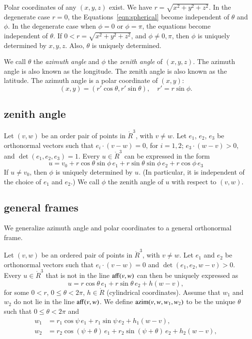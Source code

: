 Polar coordinates of any $(x,y,z)$ exist.
We have $r = \sqrt{x^2+y^2+z^2}$.  In the degenerate case $r=0$,
the Equations~\ref{eqn:spherical} become independent of $\theta$
and $\phi$. In the degenerate case when $\phi = 0$ or $\phi =
\pi$, the equations become independent of $\theta$. If $0<r =
\sqrt{x^2+y^2+z^2}$, and $\phi\ne 0,\pi$,  then $\phi$ is uniquely
determined by $x,y,z$. Also, $\theta$ is uniquely determined.


\begin{remark}\label{def:azimuth}
We call $\theta$ the {\it azimuth angle\/} and $\phi$ the {\it
zenith angle\/} of $(x,y,z)$.  The azimuth angle is also known as
the longitude.  The zenith angle is also known as the latitude. The
azimuth angle is a polar coordinate of $(x,y)$:
    $$
    (x,y) = (r'\cos\theta,r'\sin\theta), \quad r' = r\sin\phi.
    $$
\end{remark}

\subsection{zenith angle}

\begin{definition}
Let $(v,w)$ be an order pair of points in $\ring{R}^3$, with $v\ne w$.
Let $e_1$, $e_2$, $e_3$ be orthonormal vectors such that
$e_i\cdot (v-w)=0$, for $i=1,2$; $e_3\cdot (w-v)>0$,
and $\det(e_1,e_2,e_3)=1$.  Every
$u\in\ring{R}^3$ 
can be expressed in the form
   $$
   u = v_0 + r\cos\theta\sin\phi\,e_1 + r\sin\theta\sin\phi\,e_2 +
   r\cos\phi\, e_3
   $$
If $u\ne v_0$, then $\phi$ is uniquely determined by $u$.
(In particular, it is independent of the choice of $e_1$ and $e_2$.)
We call $\phi$ the zenith angle of $u$ with respect to $(v,w)$.
\end{definition}

\subsection{general frames}

We generalize azimuth angle and polar coordinates to a general orthonormal frame.

\begin{definition} Let $(v,w)$ be an ordered pair of points in
$\ring{R}^3$, with $v\ne w$.  Let $e_1$ and $e_2$ be orthonormal
vectors
such that $e_i\cdot (v-w)=0$ and $\det(e_1,e_2,w-v)>0$.  Every
$u\in\ring{R}^3$ that is not in the line ${\operatorname{aff}}(v,w)$
can then be uniquely expressed as
   $$
   u = r\cos\theta\, e_1 + r\sin\theta\, e_2 + h (w-v),
   $$
for some $0< r$, $0\le \theta < 2\pi$, $h\in\ring{R}$
(cylindrical coordinates).  Assume that $w_1$ and $w_2$ do
not lie in the line ${\operatorname{aff}}(v,w)$.
We define ${\operatorname{azim}}(v,w,w_1,w_2)$ to be the unique $\theta$ such
that $0\le\theta < 2\pi$ and
  $$
  \begin{array}{lll}
    w_1 &= r_1\cos\psi\, e_1 + r_1\sin\psi\, e_2 + h_1(w-v),\\
    w_2 &=  r_2\cos(\psi+\theta)\, e_1 + r_2\sin(\psi+\theta)\, e_2 
     + h_2(w-v),\\
\end{array}
  $$
\end{definition}

